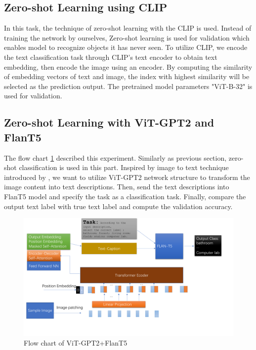 \documentclass[10pt,twocolumn,letterpaper]{article}
\begin{document}
\subsection{Zero-shot Learning using CLIP}
In this task, the technique of zero-shot learning with the CLIP\cite{DBLP:journals/corr/abs-1911-02685} is used. Instead of training the network by ourselves, Zero-shot learning is used for validation which enables model to recognize objects it has never seen. To utilize CLIP, we encode the text classification task through CLIP's text encoder to obtain text embedding, then encode the image using an encoder. By computing the similarity of embedding vectors of text and image, the index with highest similarity will be selected as the prediction output. The pretrained model parameters "ViT-B-32" is used for validation.

\subsection{Zero-shot Learning with ViT-GPT2 and FlanT5}
The flow chart \ref{FlanT5} described this experiment. Similarly as previous section, zero-shot classification is used in this part. Inspired by image to text technique introduced by \cite{abeywardana_2021}, we want to utilize ViT-GPT2 network structure to transform the image content into text descriptions. Then, send the text descriptions into FlanT5 model and specify the task as a classification task. Finally, compare the output text label with true text label and compute the validation accuracy.

\begin{figure}
    \centering
    \includegraphics[scale = 0.25]{ProgressReport/Demo.pdf}
    \caption{Flow chart of ViT-GPT2+FlanT5}
    \label{FlanT5}
\end{figure}
\end{document}
